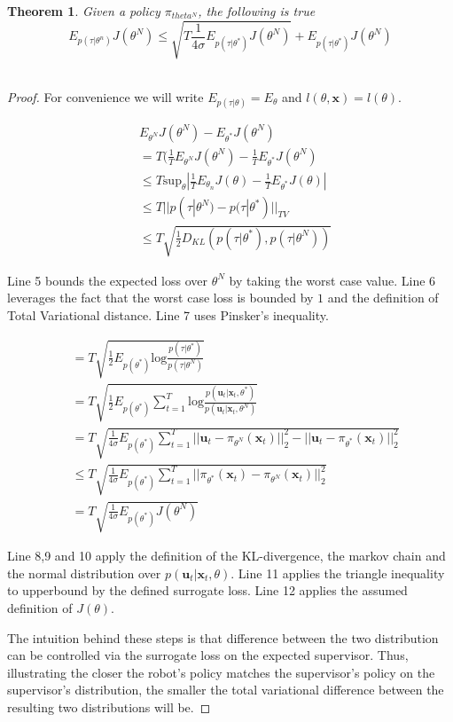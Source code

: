 \documentclass[10pt, conference]{ieeeconf}      %
\newtheorem{theorem}{Theorem}[section]
\newcommand{\bu}{\mathbf{u}}
\newcommand{\bx}{\mathbf{x}}
\begin{document}
\begin{theorem}
Given a policy $\pi_{theta^N}$, the following is true 
$$E_{p(\tau|\theta^n)} J(\theta^N) \leq \sqrt{T\frac{1}{4\sigma}E_{p(\tau|\theta^*)} J(\theta^N)}+E_{p(\tau|\theta^*)} J(\theta^N)$$\\
\end{theorem}
\begin{proof}
For convenience we will write $E_{p(\tau|\theta)} = E_{\theta}$ and $l(\theta,\bx) = l(\theta)$. 

\begin{align}
&E_{\theta^N} J(\theta^N) - E_{\theta^*} J(\theta^N) \\
&= T(\frac{1}{T}E_{\theta^N} J(\theta^N) -\frac{1}{T}E_{\theta^*} J(\theta^N)\\
&\leq  T\mbox{sup}_{\theta} |\frac{1}{T}E_{\theta_n}J(\theta) - \frac{1}{T}E_{\theta^*} J(\theta)|\\
&\leq  T| | p(\tau|\theta^N) - p(\tau|\theta^*)||_{TV}\\
&\leq T\sqrt{\frac{1}{2} D_{KL}(p(\tau|\theta^*),p(\tau|\theta^N))}
\end{align}

Line 5 bounds the expected loss over $\theta^N$ by taking the worst case value. Line 6 leverages the fact that the worst case loss is bounded by $1$ and the definition of Total Variational distance. Line 7 uses Pinsker's inequality. 


\begin{align}
&= T\sqrt{\frac{1}{2} E_{p(\theta^*)} \mbox{log} \frac{p(\tau|\theta^*)}{p(\tau|\theta^N)}}\\
&= T\sqrt{\frac{1}{2} E_{p(\theta^*)} \sum^T_{t=1}\mbox{log} \frac{p(\bu_t|\bx_t,\theta^*)}{p(\bu_t|\bx_t,\theta^N)}}\\
&= T\sqrt{\frac{1}{4\sigma} E_{p(\theta^*)} \sum^T_{t=1} ||\bu_t- \pi_{\theta^N}(\bx_t)||_2^2 - ||\bu_t- \pi_{\theta^*}(\bx_t)||_2^2}\\
&\leq T\sqrt{\frac{1}{4\sigma} E_{p(\theta^*)} \sum^T_{t=1}  ||\pi_{\theta^*}(\bx_t) - \pi_{\theta^N}(\bx_t)||_2^2}\\
&= T\sqrt{\frac{1}{4\sigma} E_{p(\theta^*)} J(\theta^N)}
\end{align}

Line 8,9 and 10 apply the definition of the KL-divergence, the markov chain and the normal distribution over $p(\bu_t|\bx_t,\theta)$. Line 11 applies the triangle inequality to upperbound by the defined surrogate loss. Line 12 applies the assumed definition of $J(\theta)$. 

The intuition behind these steps is that difference between  the two distribution can be controlled via the surrogate loss on the expected supervisor. Thus, illustrating the closer the robot's policy matches the supervisor's policy on the supervisor's distribution, the smaller the total variational difference between the resulting two distributions will be.


\end{proof}
 
\end{document}
